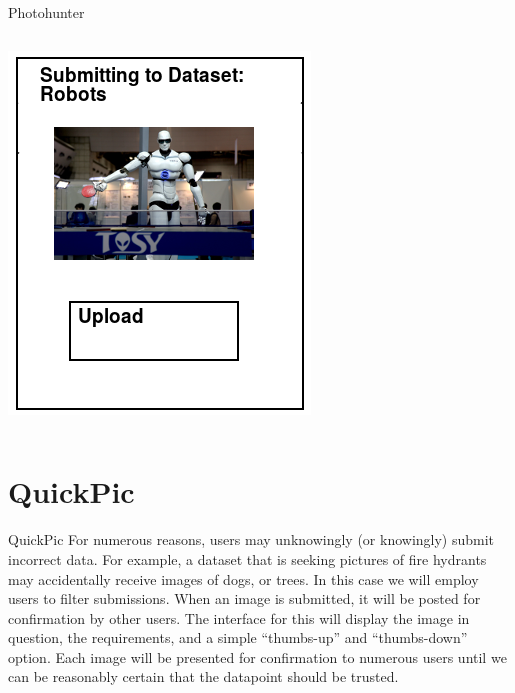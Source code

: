 \documentclass[aspectratio=169]{beamer}
\begin{document}
\begin{frame}{Photohunter}
\begin{columns}[c]
\begin{column}{0.5\columnwidth}
      \includegraphics[width=\columnwidth]{ss_photohunter_upload}
    \end{column}
  \end{columns}
\end{frame}

\section{QuickPic}

\begin{frame}{QuickPic}
  For numerous reasons, users may unknowingly (or knowingly) submit
  incorrect data. For example, a dataset that is seeking pictures of
  fire hydrants may accidentally receive images of dogs, or trees. In
  this case we will employ users to filter submissions. When an image
  is
  submitted, it will be posted for confirmation by other users. The
  interface for this will display the image in question, the
  requirements, and a simple ``thumbs-up'' and ``thumbs-down'' option.
  Each image will be presented for confirmation to numerous users
  until
  we can be reasonably certain that the datapoint should be trusted.
\end{frame}
\end{document}
